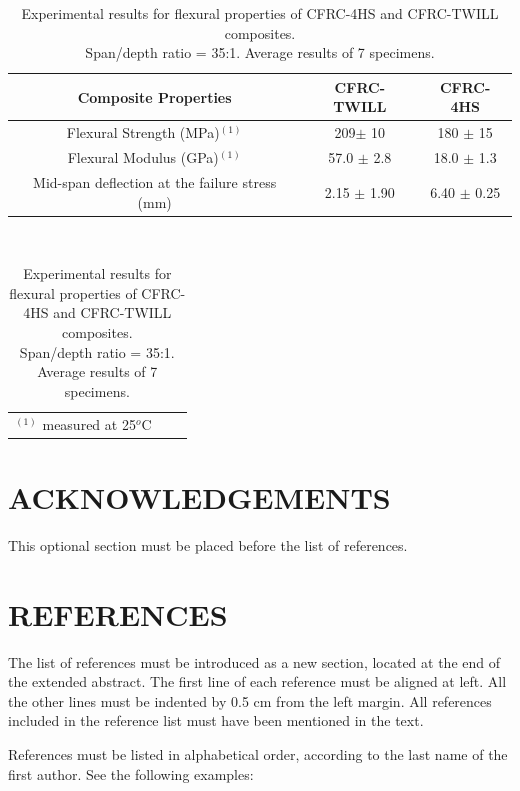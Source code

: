 \documentclass[10pt,fleqn,a4paper,twoside]{article}
\begin{document}
\begin{table}[!h]
\centering
\caption{Experimental results for flexural properties of CFRC-4HS and CFRC-TWILL composites. \protect\\Span/depth ratio = 35:1. Average results of 7 specimens.}
\begin{tabular}{|c|c|c|}
\hline
Composite Properties & CFRC-TWILL & CFRC-4HS\\
\hline
Flexural Strength (MPa)$^{(1)}$ & 209$\pm$ 10 & 180 $\pm$  15\\
\hline
Flexural Modulus (GPa)$^{(1)}$ & 57.0 $\pm$ 2.8 & 18.0 $\pm$  1.3\\
\hline
Mid-span deflection at the failure stress (mm) & 2.15 $\pm$  1.90 & 6.40 $\pm$  0.25\\
\hline
\end{tabular}
\\
\begin{tabular}{p{11cm}ll}
$^{(1)}$ measured at 25$^{o}$C & &
\end{tabular}
\label{tab1}
\end{table}

\section{ACKNOWLEDGEMENTS}
This optional section must be placed before the list of references.

\section{REFERENCES} 

The list of references must be introduced as a new section, located at the end of the extended abstract. The first line of each reference must be aligned at left.  All the other lines must be indented by 0.5 cm from the left margin. All references included in the reference list must have been mentioned in the text.

References must be listed in alphabetical order, according to the last name of the first author. See the following examples:


\renewcommand{\refname}{}

\end{document}
